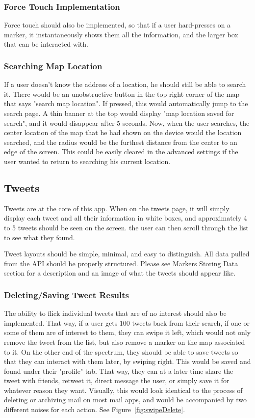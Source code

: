 \documentclass[11pt]{article}
\begin{document}
\subsubsection{Force Touch Implementation}
Force touch should also be implemented, so that if a user hard-presses on a marker, it instantaneously shows them all the information, and the larger box that can be interacted with.

\subsubsection{Searching Map Location}
If a user doesn't know the address of a location, he should still be able to search it. There would be an unobstructive button in the top right corner of the map that says "search map location". If pressed, this would automatically jump to the search page. A thin banner at the top would display "map location saved for search", and it would disappear after 5 seconds. Now, when the user searches, the center location of the map that he had shown on the device would the location searched, and the radius would be the furthest distance from the center to an edge of the screen. This could be easily cleared in the advanced settings if the user wanted to return to searching his current location.

\subsection{Tweets}
Tweets are at the core of this app. When on the tweets page, it will simply display each tweet and all their information in white boxes, and approximately 4 to 5 tweets should be seen on the screen. the user can then scroll through the list to see what they found.

Tweet layouts should be simple, minimal, and easy to distinguish. All data pulled from the API should be properly structured. Please see Markers Storing Data section for a description and an image of what the tweets should appear like.


\subsubsection{Deleting/Saving Tweet Results}
The ability to flick individual tweets that are of no interest should also be implemented. That way, if a user gets 100 tweets back from their search, if one or some of them are of interest to them, they can swipe it left, which would not only remove the tweet from the list, but also remove a marker on the map associated to it. On the other end of the spectrum, they should be able to save tweets so that they can interact with them later, by swiping right. This would be saved and found under their "profile" tab. That way, they can at a later time share the tweet with friends, retweet it, direct message the user, or simply save it for whatever reason they want. Visually, this would look identical to the process of deleting or archiving mail on most mail apps, and would be accompanied by two different noises for each action. See Figure~\ref{fig:swipeDelete}.
\end{document}
